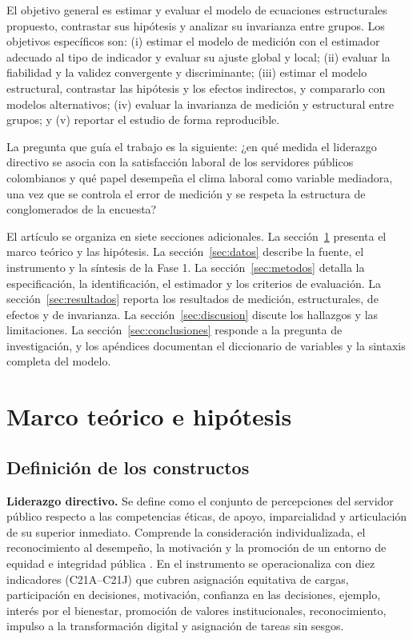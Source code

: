 \documentclass[11pt,a4paper]{article}
\begin{document}
El objetivo general es estimar y evaluar el modelo de ecuaciones estructurales propuesto,
contrastar sus hipótesis y analizar su invarianza entre grupos. Los objetivos específicos
son: (i) estimar el modelo de medición con el estimador adecuado al tipo de indicador y
evaluar su ajuste global y local; (ii) evaluar la fiabilidad y la validez convergente y
discriminante; (iii) estimar el modelo estructural, contrastar las hipótesis y los efectos
indirectos, y compararlo con modelos alternativos; (iv) evaluar la invarianza de medición y
estructural entre grupos; y (v) reportar el estudio de forma reproducible.

La pregunta que guía el trabajo es la siguiente: ¿en qué medida el liderazgo directivo se
asocia con la satisfacción laboral de los servidores públicos colombianos y qué papel
desempeña el clima laboral como variable mediadora, una vez que se controla el error de
medición y se respeta la estructura de conglomerados de la encuesta?

El artículo se organiza en siete secciones adicionales. La sección~\ref{sec:marco} presenta
el marco teórico y las hipótesis. La sección~\ref{sec:datos} describe la fuente, el
instrumento y la síntesis de la Fase 1. La sección~\ref{sec:metodos} detalla la
especificación, la identificación, el estimador y los criterios de evaluación. La
sección~\ref{sec:resultados} reporta los resultados de medición, estructurales, de efectos
y de invarianza. La sección~\ref{sec:discusion} discute los hallazgos y las limitaciones.
La sección~\ref{sec:conclusiones} responde a la pregunta de investigación, y los apéndices
documentan el diccionario de variables y la sintaxis completa del modelo.

\section{Marco teórico e hipótesis}\label{sec:marco}

\subsection{Definición de los constructos}

\textbf{Liderazgo directivo.} Se define como el conjunto de percepciones del servidor
público respecto a las competencias éticas, de apoyo, imparcialidad y articulación de su
superior inmediato. Comprende la consideración individualizada, el reconocimiento al
desempeño, la motivación y la promoción de un entorno de equidad e integridad pública
\citep{avolio2004}. En el instrumento se operacionaliza con diez indicadores (C21A--C21J)
que cubren asignación equitativa de cargas, participación en decisiones, motivación,
confianza en las decisiones, ejemplo, interés por el bienestar, promoción de valores
institucionales, reconocimiento, impulso a la transformación digital y asignación de tareas
sin sesgos.
\end{document}
